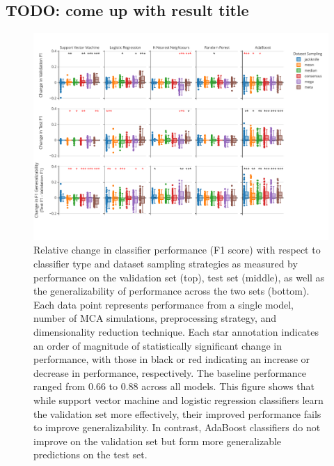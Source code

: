 \documentclass[fleqn,10pt]{SelfArx} %
\begin{document}
\subsection*{TODO: come up with result title}
\begin{figure}[hbt]\centering
\includegraphics[width=\linewidth]{figures/1.pdf}
\caption{Relative change in classifier performance (F1 score) with respect to classifier type and dataset sampling
strategies as measured by performance on the validation set (top), test set (middle), as well as the generalizability
of performance across the two sets (bottom). Each data point represents performance from a single model, number of MCA
simulations, preprocessing strategy, and dimensionality reduction technique. Each star annotation indicates an order of
magnitude of statistically significant change in performance, with those in black or red indicating an increase or
decrease in performance, respectively. The baseline performance ranged from $0.66$ to $0.88$ across all models. This
figure shows that while support vector machine and logistic regression classifiers learn the validation set more
effectively, their improved performance fails to improve generalizability. In contrast, AdaBoost classifiers do not
improve on the validation set but form more generalizable predictions on the test set.}
\label{fig:overall_performance}
\end{figure}
\end{document}
